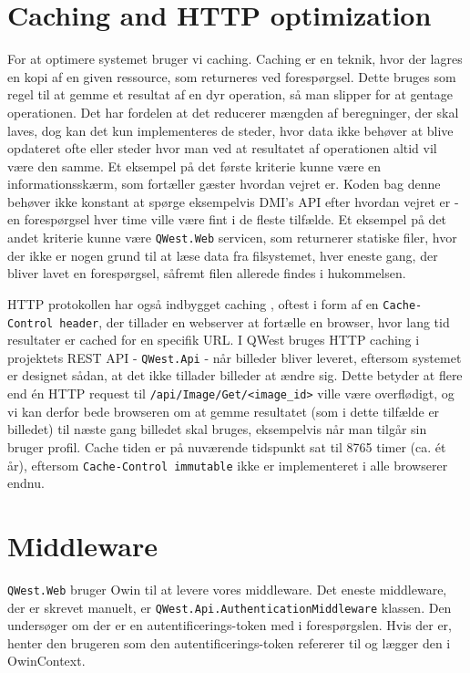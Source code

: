\section{Caching and HTTP optimization}\label{sec:caching}
For at optimere systemet bruger vi caching. Caching er en teknik, hvor der lagres en kopi af en given ressource, som returneres ved forespørgsel. \cite{HTTPcaching} Dette bruges som regel til at gemme et resultat af en dyr operation, så man slipper for at gentage operationen. Det har fordelen at det reducerer mængden af beregninger, der skal laves, dog kan det kun implementeres de steder, hvor data ikke behøver at blive opdateret ofte eller steder hvor man ved at resultatet af operationen altid vil være den samme. 
Et eksempel på det første kriterie kunne være en informationsskærm, som fortæller gæster hvordan vejret er. Koden bag denne behøver ikke konstant at spørge eksempelvis DMI's API efter hvordan vejret er - en forespørgsel hver time ville være fint i de fleste tilfælde. Et eksempel på det andet kriterie kunne være \texttt{QWest.Web} servicen, som returnerer statiske filer, hvor der ikke er nogen grund til at læse data fra filsystemet, hver eneste gang, der bliver lavet en forespørgsel, såfremt filen allerede findes i hukommelsen.

HTTP protokollen har også indbygget caching \cite{HTTPcaching}, oftest i form af en \texttt{Cache-Control header}, der tillader en webserver at fortælle en browser, hvor lang tid resultater er cached for en specifik URL. I QWest bruges HTTP caching i projektets REST API - \texttt{QWest.Api} - når billeder bliver leveret, eftersom systemet er designet sådan, at det ikke tillader billeder at ændre sig. Dette betyder at flere end én HTTP request til \texttt{/api/Image/Get/<image\_id>} ville være overflødigt, og vi kan derfor bede browseren om at gemme resultatet (som i dette tilfælde er billedet) til næste gang billedet skal bruges, eksempelvis når man tilgår sin bruger profil. Cache tiden er på nuværende tidspunkt sat til 8765 timer (ca. ét år), eftersom \texttt{Cache-Control immutable} ikke er implementeret i alle browserer endnu.

\section{Middleware}\label{sec:middleware}
\texttt{QWest.Web} bruger Owin \cite{Owin} til at levere vores middleware. Det eneste middleware, der er skrevet manuelt, er \texttt{QWest.Api.AuthenticationMiddleware} klassen. Den undersøger om der er en autentificerings-token med i forespørgslen. Hvis der er, henter den brugeren som den autentificerings-token refererer til og lægger den i OwinContext. 